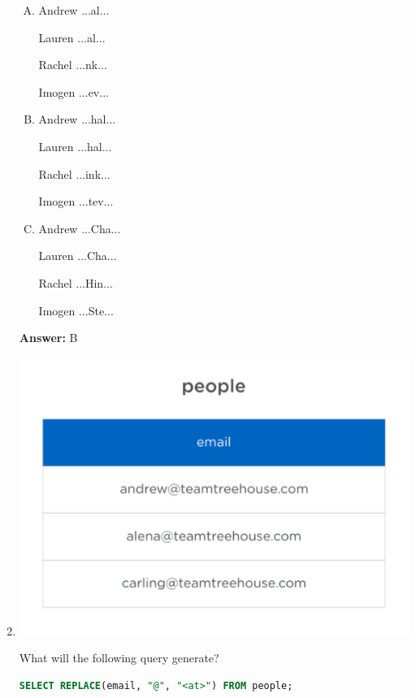 \documentclass[12pt]{article}
\begin{document}
\begin{enumerate}[1.]
    \begin{enumerate}[A.]
        \item
        Andrew	...al...

        Lauren	...al...

        Rachel	...nk...

        Imogen	...ev...

        \item
        Andrew	...hal...

        Lauren	...hal...

        Rachel	...ink...

        Imogen	...tev...

        \item
        Andrew	...Cha...

        Lauren	...Cha...

        Rachel	...Hin...

        Imogen	...Ste...

    \end{enumerate}

    \bigskip

    \textbf{Answer:} B

    \item

    \begin{center}
    \includegraphics[width=0.8 \linewidth]{images/part_2_notes_5.png}
    \end{center}

    \bigskip

    What will the following query generate?

    \bigskip

    \begin{lstlisting}[language=SQL]
    SELECT REPLACE(email, "@", "<at>") FROM people;
    \end{lstlisting}


\end{enumerate}
\end{document}
